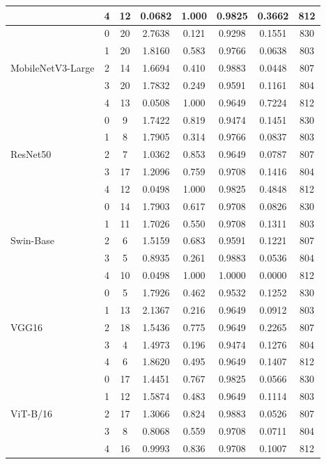 \documentclass[a4paper,fleqn]{cas-sc}
\begin{document}
\begin{heretable}
\begin{tabular*}{\textwidth}{@{\extracolsep{\fill}}lccccccc@{}}
 & 4 & 12 & 0.0682 & 1.000 & 0.9825 & 0.3662 & 812 \\
\midrule
\multirow{5}{*}{MobileNetV3-Large} & 0 & 20 & 2.7638 & 0.121 & 0.9298 & 0.1551 & 830 \\
 & 1 & 20 & 1.8160 & 0.583 & 0.9766 & 0.0638 & 803 \\
 & 2 & 14 & 1.6694 & 0.410 & 0.9883 & 0.0448 & 807 \\
 & 3 & 20 & 1.7832 & 0.249 & 0.9591 & 0.1161 & 804 \\
 & 4 & 13 & 0.0508 & 1.000 & 0.9649 & 0.7224 & 812 \\
\midrule
\multirow{5}{*}{ResNet50} & 0 & 9 & 1.7422 & 0.819 & 0.9474 & 0.1451 & 830 \\
 & 1 & 8 & 1.7905 & 0.314 & 0.9766 & 0.0837 & 803 \\
 & 2 & 7 & 1.0362 & 0.853 & 0.9649 & 0.0787 & 807 \\
 & 3 & 17 & 1.2096 & 0.759 & 0.9708 & 0.1416 & 804 \\
 & 4 & 12 & 0.0498 & 1.000 & 0.9825 & 0.4848 & 812 \\
\midrule
\multirow{5}{*}{Swin-Base} & 0 & 14 & 1.7903 & 0.617 & 0.9708 & 0.0826 & 830 \\
 & 1 & 11 & 1.7026 & 0.550 & 0.9708 & 0.1311 & 803 \\
 & 2 & 6 & 1.5159 & 0.683 & 0.9591 & 0.1221 & 807 \\
 & 3 & 5 & 0.8935 & 0.261 & 0.9883 & 0.0536 & 804 \\
 & 4 & 10 & 0.0498 & 1.000 & 1.0000 & 0.0000 & 812 \\
\midrule
\multirow{5}{*}{VGG16} & 0 & 5 & 1.7926 & 0.462 & 0.9532 & 0.1252 & 830 \\
 & 1 & 13 & 2.1367 & 0.216 & 0.9649 & 0.0912 & 803 \\
 & 2 & 18 & 1.5436 & 0.775 & 0.9649 & 0.2265 & 807 \\
 & 3 & 4 & 1.4973 & 0.196 & 0.9474 & 0.1276 & 804 \\
 & 4 & 6 & 1.8620 & 0.495 & 0.9649 & 0.1407 & 812 \\
\midrule
\multirow{5}{*}{ViT-B/16} & 0 & 17 & 1.4451 & 0.767 & 0.9825 & 0.0566 & 830 \\
 & 1 & 12 & 1.5874 & 0.483 & 0.9649 & 0.1114 & 803 \\
 & 2 & 17 & 1.3066 & 0.824 & 0.9883 & 0.0526 & 807 \\
 & 3 & 8 & 0.8068 & 0.559 & 0.9708 & 0.0711 & 804 \\
 & 4 & 16 & 0.9993 & 0.836 & 0.9708 & 0.1007 & 812 \\
\bottomrule
\end{tabular*}
\end{heretable}
\end{document}
